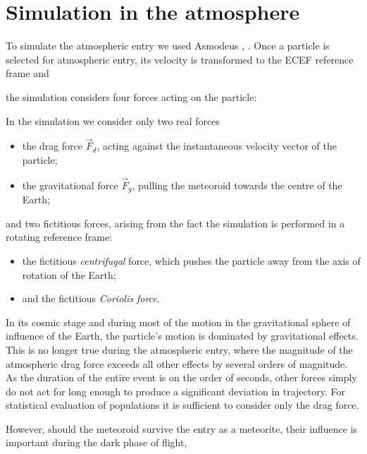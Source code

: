 \section{Simulation in the atmosphere} \label{aa}
    To simulate the atmospheric entry we used Asmodeus \citep{balaz-thesis}, \citep{balaz+2020}.
    Once a particle is selected for atmospheric entry, its velocity is transformed to the ECEF reference frame
    and 

        the simulation considers four forces acting on the particle:

    In the simulation we consider only two real forces
    \begin{itemize}
        \item the drag force $\vec{F}_{d}$, acting against the instantaneous velocity vector of the particle;
        \item the gravitational force $\vec{F}_{g}$, pulling the meteoroid towards the centre of the Earth;
    \end{itemize}

    
    and two fictitious forces, arising from the fact the simulation is performed in a rotating reference frame:
    \begin{itemize}
        \item the fictitious \emph{centrifugal} force, which pushes the particle away from the axis of rotation of the Earth;
        \item and the fictitious \emph{Coriolis force}.
    \end{itemize}

    In its cosmic stage and during most of the motion in the gravitational sphere of influence of the Earth,
    the particle's motion is dominated by gravitational effects. This is no longer true during the atmospheric entry,
    where the magnitude of the atmospheric drag force exceeds all other effects by several orders of magnitude.
    As the duration of the entire event is on the order of seconds, other forces simply do not act for long enough
    to produce a significant deviation in trajectory. For statistical evaluation of populations it is sufficient
    to consider only the drag force.

    However, should the meteoroid survive the entry as a meteorite,  their influence is important during the dark phase of flight,
